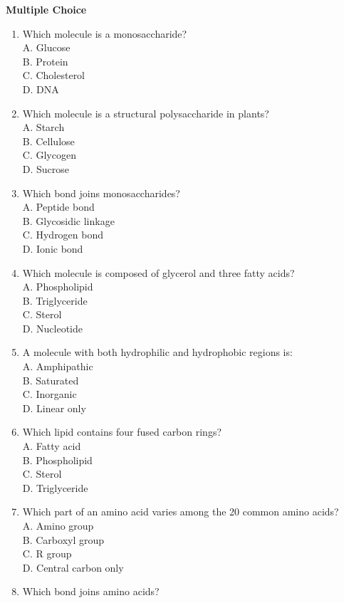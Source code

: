 \documentclass[
  letterpaper,
  DIV=11,
  numbers=noendperiod]{scrreprt}
\begin{document}
\textbf{Multiple Choice}

\begin{enumerate}
\def\labelenumi{\arabic{enumi}.}
\item
  Which molecule is a monosaccharide?\\
  A. Glucose\\
  B. Protein\\
  C. Cholesterol\\
  D. DNA
\item
  Which molecule is a structural polysaccharide in plants?\\
  A. Starch\\
  B. Cellulose\\
  C. Glycogen\\
  D. Sucrose
\item
  Which bond joins monosaccharides?\\
  A. Peptide bond\\
  B. Glycosidic linkage\\
  C. Hydrogen bond\\
  D. Ionic bond
\item
  Which molecule is composed of glycerol and three fatty acids?\\
  A. Phospholipid\\
  B. Triglyceride\\
  C. Sterol\\
  D. Nucleotide
\item
  A molecule with both hydrophilic and hydrophobic regions is:\\
  A. Amphipathic\\
  B. Saturated\\
  C. Inorganic\\
  D. Linear only
\item
  Which lipid contains four fused carbon rings?\\
  A. Fatty acid\\
  B. Phospholipid\\
  C. Sterol\\
  D. Triglyceride
\item
  Which part of an amino acid varies among the 20 common amino acids?\\
  A. Amino group\\
  B. Carboxyl group\\
  C. R group\\
  D. Central carbon only
\item
  Which bond joins amino acids?\\

\end{enumerate}
\end{document}

